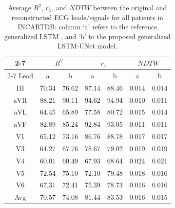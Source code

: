 

\begin{table}
\begin{center}
\begin{small}
\renewcommand{\arraystretch}{1.1}
\renewcommand{\tabcolsep}{6pt}

\caption{Average $R^2$, $r_x$, and $NDTW$ between the original and reconstructed ECG leads/signals for all patients in INCARTDB: column `a' refers to the reference generalized LSTM \cite{lstm}, and `b' to the proposed generalized LSTM-UNet model.}

\begin{tabular}{|c|cc|cc|cc|}
\hline
\cline{2-7}
& \multicolumn{2}{c|}{$R^2$}
& \multicolumn{2}{c|}{$r_x$} & \multicolumn{2}{c|}{$NDTW$} 
\\
\cline{2-7}
Lead & a & b & a & b & a & b \\
\hline
III & 70.34 & 76.62 & 87.14  & 88.46 & 0.014 & 0.014\\
aVR & 88.21 & 90.11 & 94.62  & 94.94 & 0.010 & 0.011\\
aVL & 64.45 & 65.89 & 77.58  & 80.72 & 0.015 & 0.014 \\
aVF & 82.89 & 85.24 & 92.84  & 93.05 & 0.011 & 0.011 \\
V1 & 65.12  & 73.16 & 86.76  & 88.78 & 0.017 & 0.017\\
V3 & 64.27  & 67.76 & 78.67  & 79.02 & 0.019 & 0.019 \\
V4 & 60.01 & 60.49 &  67.93 & 68.64 & 0.024 & 0.021\\
V5 & 72.54  & 75.10 & 72.10 & 79.48 & 0.018 & 0.016 \\
V6 & 67.31 & 72.41 & 75.39  & 78.73 & 0.016 & 0.016 \\
\hline
Avg & 70.57 & 74.08 &  81.44 & 83.53 & 0.016 & 0.015 \\


\hline
\end{tabular}
\label{incart_results}
\end{small}

\end{center}
\end{table}